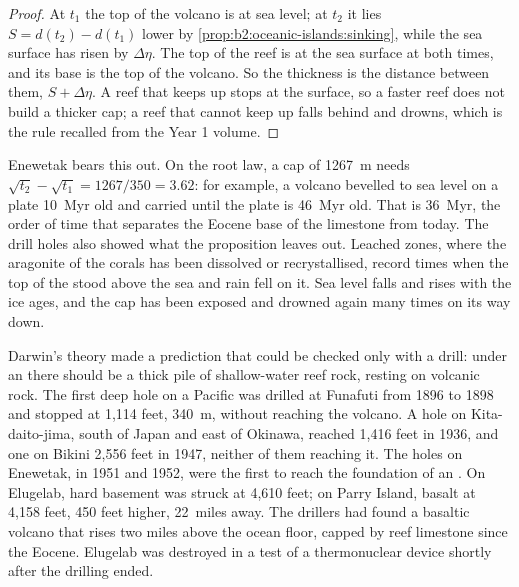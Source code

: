 \begin{proof}
At $t_1$ the top of the volcano is at sea level; at $t_2$ it lies $S = d(t_2) - d(t_1)$ lower by
\cref{prop:b2:oceanic-islands:sinking}, while the sea surface has risen by $\Delta\eta$. The top
of the reef is at the sea surface at both times, and its base is the top of the volcano. So the
thickness is the distance between them, $S + \Delta\eta$. A reef that keeps up stops at the
surface, so a faster reef does not build a thicker cap; a reef that cannot keep up falls behind
and drowns, which is the rule recalled from the Year 1 volume.
\end{proof}

Enewetak bears this out. On the root law, a cap of \qty{1267}{m} needs $\sqrt{t_2} - \sqrt{t_1} =
1267/350 = 3.62$: for example, a volcano bevelled to sea level on a plate \qty{10}{Myr} old and
carried until the plate is \qty{46}{Myr} old. That is \qty{36}{Myr}, the order of time that
separates the Eocene base of the limestone from today. The drill holes also showed what the
proposition leaves out. Leached zones, where the aragonite of the corals has been dissolved or
recrystallised, record times when the top of the  stood above the sea and rain fell on it.
Sea level falls and rises with the ice ages, and the cap has been exposed and drowned again many
times on its way down.

\begin{history}
Darwin's theory made a prediction that could be checked only with a drill: under an  there
should be a thick pile of shallow-water reef rock, resting on volcanic rock. The first deep hole
on a Pacific  was drilled at Funafuti from 1896 to 1898 and stopped at 1,114 feet,
\qty{340}{m}, without reaching the volcano. A hole on Kita-daito-jima, south of Japan and east of Okinawa,
reached 1,416 feet in 1936, and one on Bikini 2,556 feet in 1947, neither of them reaching it. The holes on Enewetak, in
1951 and 1952, were the first to reach the foundation of an . On Elugelab, hard basement was
struck at 4,610 feet; on Parry Island, basalt at 4,158 feet, 450 feet higher, \num{22}~miles
away. The drillers had found a basaltic volcano that rises two miles above the ocean floor, capped
by reef limestone since the Eocene. Elugelab was destroyed in a test of a thermonuclear device
shortly after the drilling ended.
\end{history}

